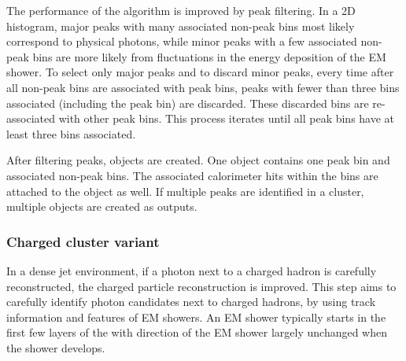 


The performance of the \peakFinding algorithm is improved by peak filtering. In a 2D histogram,  major peaks with many associated non-peak bins most likely correspond to physical photons, while minor peaks with a few associated non-peak bins are more likely from fluctuations in the energy deposition of the EM shower. To select only major peaks and to discard minor peaks, every time after all non-peak bins are associated with peak bins, peaks with fewer than three bins associated (including the peak bin) are discarded. These discarded bins are re-associated with other peak bins. This  process iterates until all peak bins have at least three bins associated.


After  filtering peaks,  \ShowerPeak  objects are created. One \ShowerPeak object contains one peak bin and associated non-peak bins. The associated calorimeter hits within the bins are attached to the \ShowerPeak object as well. If multiple peaks are identified in a cluster, multiple \ShowerPeak objects are created as outputs.



\subsubsection{Charged cluster variant}
\label{sec:photon2Dtrack}

In a dense jet environment, if a photon next to a charged hadron is carefully reconstructed, the charged particle reconstruction is improved. This step aims to carefully identify photon candidates next to charged hadrons, by using track information and features of EM showers. An EM shower typically starts in the first few layers of the \ECAL with  direction of the EM shower largely unchanged when the shower develops.



